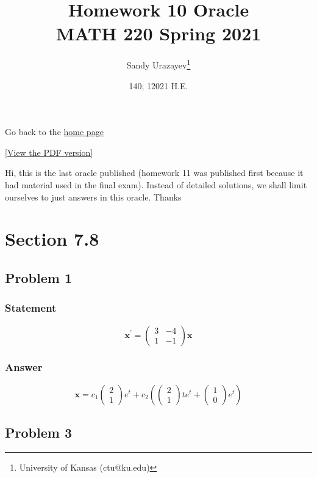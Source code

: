 \documentclass[12pt]{article}
\author{Sandy Urazayev\thanks{University of Kansas (ctu@ku.edu)}}
\date{140; 12021 H.E.}
\title{Homework 10 Oracle\\\medskip
\large MATH 220 Spring 2021}
\begin{document}
\maketitle
Go back to the \href{../../}{home page}

\href{./index.pdf}{[View the PDF version]​}

Hi, this is the last oracle published (homework 11 was published first because
it had material used in the final exam). Instead of detailed solutions, we shall
limit ourselves to just answers in this oracle. Thanks

\section*{Section 7.8}
\label{sec:orgb1869a7}
\subsection*{Problem 1}
\label{sec:orgcef2791}
\subsubsection*{Statement}
\label{sec:org7f08198}
   \begin{equation*}
\mathbf{x}^{\prime}=\left(\begin{array}{ll}
3 & -4 \\
1 & -1
\end{array}\right) \mathbf{x}
\end{equation*}
\subsubsection*{Answer}
\label{sec:orge091854}
    \begin{equation*}
\mathbf{x}=c_{1}\left(\begin{array}{l}
2 \\
1
\end{array}\right) e^{t}+c_{2}\left(\left(\begin{array}{l}
2 \\
1
\end{array}\right) t e^{t}+\left(\begin{array}{l}
1 \\
0
\end{array}\right) e^{t}\right)
\end{equation*}
\subsection*{Problem 3}
\label{sec:orgad8a7a7}
\end{document}
